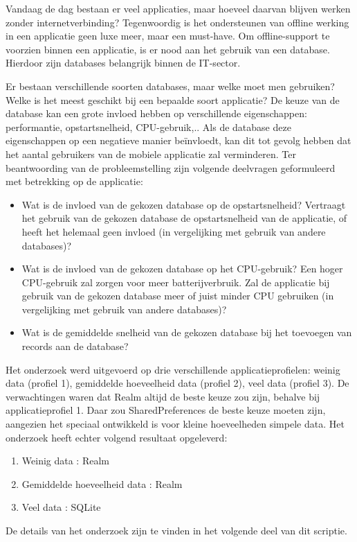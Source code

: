  \begin{displayquote}
 	Vandaag de dag bestaan er veel applicaties, maar hoeveel daarvan blijven werken
 	zonder internetverbinding? Tegenwoordig is het ondersteunen van offline werking in
 	een applicatie geen luxe meer, maar een must-have. Om offline-support te voorzien
 	binnen een applicatie, is er nood aan het gebruik van een database. Hierdoor zijn
 	databases belangrijk binnen de IT-sector.
 	
 	Er bestaan verschillende soorten databases, maar welke moet men gebruiken?
 	Welke is het meest geschikt bij een bepaalde soort applicatie? De keuze van de database
 	kan een grote invloed hebben op verschillende eigenschappen: performantie,
 	opstartsnelheid, CPU-gebruik,.. Als de database deze eigenschappen op een negatieve
 	manier beïnvloedt, kan dit tot gevolg hebben dat het aantal gebruikers van de mobiele
 	applicatie zal verminderen. Ter beantwoording van de probleemstelling zijn volgende
 	deelvragen geformuleerd met betrekking op de applicatie:
 	\begin{itemize}
 		\item 	Wat is de invloed van de gekozen database op de opstartsnelheid? Vertraagt het
 		gebruik van de gekozen database de opstartsnelheid van de applicatie, of heeft
 		het helemaal geen invloed (in vergelijking met gebruik van andere databases)?
 		\item Wat is de invloed van de gekozen database op het CPU-gebruik? Een hoger
 		CPU-gebruik zal zorgen voor meer batterijverbruik. Zal de applicatie bij gebruik
 		van de gekozen database meer of juist minder CPU gebruiken (in vergelijking
 		met gebruik van andere databases)?
 		\item  Wat is de gemiddelde snelheid van de gekozen database bij het toevoegen van
 		records aan de database?
 	\end{itemize}
 	
 	
 	Het onderzoek werd uitgevoerd op drie verschillende applicatieprofielen: weinig data
 	(profiel 1), gemiddelde hoeveelheid data (profiel 2), veel data (profiel 3).
 	De verwachtingen waren dat Realm altijd de beste keuze zou zijn, behalve bij
 	applicatieprofiel 1. Daar zou SharedPreferences de beste keuze moeten zijn, aangezien
 	het speciaal ontwikkeld is voor kleine hoeveelheden simpele data. Het onderzoek heeft
 	echter volgend resultaat opgeleverd:
 	
 	\begin{enumerate}
 		\item Weinig data : Realm
 		\item Gemiddelde hoeveelheid data : Realm
 		\item Veel data : SQLite
 	\end{enumerate}
 	De details van het onderzoek zijn te vinden in het volgende deel van dit scriptie.
 \end{displayquote}
 
